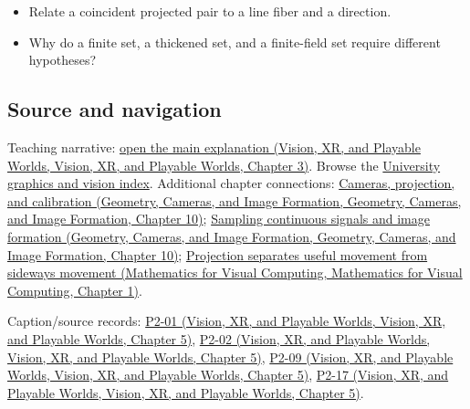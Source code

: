 \begin{itemize}
\tightlist
\item
  Relate a coincident projected pair to a line fiber and a direction.
\item
  Why do a finite set, a thickened set, and a finite-field set require different hypotheses?
\end{itemize}

\subsection{Source and navigation}\label{appendix-3c73f7862157-source-and-navigation}

Teaching narrative: \href{../07-Vision-XR-and-Playable-Worlds/main.pdf\#nameddest=04-visual-computing-ii-ch032-finite-field-projections-turn-image-size-into-collision-counts}{open the main explanation (Vision, XR, and Playable Worlds, Vision, XR, and Playable Worlds, Chapter 3)}. Browse the \hyperref[appendix-a6d556a4ef50-university-graphics-vision-and-photography---independent-series]{University graphics and vision index}. Additional chapter connections: \href{../03-Geometry-Cameras-and-Image-Formation/main.pdf\#nameddest=03-visual-computing-i-ch003-cameras-projection-and-calibration}{Cameras, projection, and calibration (Geometry, Cameras, and Image Formation, Geometry, Cameras, and Image Formation, Chapter 10)}; \href{../03-Geometry-Cameras-and-Image-Formation/main.pdf\#nameddest=03-visual-computing-i-ch003-sampling-continuous-signals-and-image-formation}{Sampling continuous signals and image formation (Geometry, Cameras, and Image Formation, Geometry, Cameras, and Image Formation, Chapter 10)}; \href{../02-Mathematics-for-Visual-Computing/main.pdf\#nameddest=01-foundations-i-ch017-projection-separates-useful-movement-from-sideways-movement}{Projection separates useful movement from sideways movement (Mathematics for Visual Computing, Mathematics for Visual Computing, Chapter 1)}.

Caption/source records: \href{../07-Vision-XR-and-Playable-Worlds/main.pdf\#nameddest=04-visual-computing-ii-ch036-p2-01---lecture-01-introduction-to-projection-theory}{P2-01 (Vision, XR, and Playable Worlds, Vision, XR, and Playable Worlds, Chapter 5)}, \href{../07-Vision-XR-and-Playable-Worlds/main.pdf\#nameddest=04-visual-computing-ii-ch036-p2-02---lecture-02-fundamental-methods-of-projection-theory}{P2-02 (Vision, XR, and Playable Worlds, Vision, XR, and Playable Worlds, Chapter 5)}, \href{../07-Vision-XR-and-Playable-Worlds/main.pdf\#nameddest=04-visual-computing-ii-ch036-p2-09---lecture-09-reflections-on-the-szemeredi-trotter-theorem}{P2-09 (Vision, XR, and Playable Worlds, Vision, XR, and Playable Worlds, Chapter 5)}, \href{../07-Vision-XR-and-Playable-Worlds/main.pdf\#nameddest=04-visual-computing-ii-ch036-p2-17---lecture-17-random-walks-on-finite-groups-part-1}{P2-17 (Vision, XR, and Playable Worlds, Vision, XR, and Playable Worlds, Chapter 5)}.
